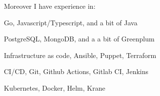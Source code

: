 Moreover I have experience in:
\begin{bulist}
  \item Go, Javascript/Typescript, and a bit of Java
  \item PostgreSQL, MongoDB, and a a bit of Greenplum
  \item Infrastructure as code, Ansible, Puppet, Terraform
  \item CI/CD, Git, Github Actions, Gitlab CI, Jenkins
  \item Kubernetes, Docker, Helm, Krane
\end{bulist}

